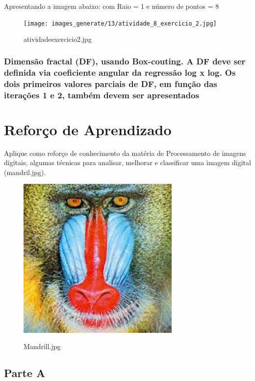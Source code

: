 \documentclass[10pt,a4paper]{article}
\begin{document}
\begin{flushleft}
Apresentando a imagem abaixo: com Raio = 1 e número de pontos = 8 
\end{flushleft}

\begin{figure}[H]
    \centering
    {{\texttt{[image: images\_generate/13/atividade\_8\_exercicio\_2.jpg]}}}
    \caption{atividade\textunderscore exercicio\textunderscore 2.jpg}
\end{figure}

\subsubsection{Dimensão fractal (DF), usando Box-couting. A DF deve ser definida via coeficiente angular da regressão log x log. Os dois primeiros valores parciais de DF, em função das iterações 1 e 2, também devem ser apresentados}

\pagebreak

\section{Reforço de Aprendizado}

Aplique como reforço de conhecimento da matéria de Processamento de imagens digitais, algumas técnicas para analisar, melhorar e classificar uma imagem digital (mandril.jpg).

\begin{figure}[H]
    \centering
    {{\includegraphics[width=8cm]{images_original/14/Mandrill.jpg}}}
    \caption{Mandrill.jpg}
\end{figure}

\subsection{Parte A}
\end{document}
